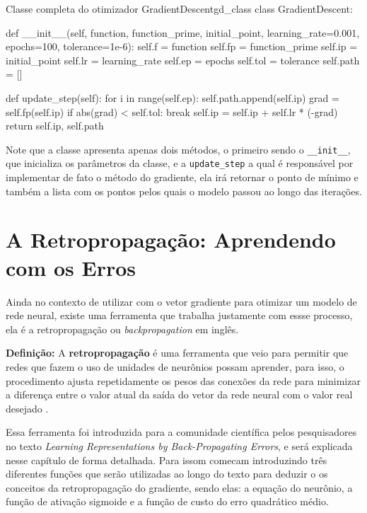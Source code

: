 \begin{codelisting}{Classe completa do otimizador GradientDescent}{gd_class}
class GradientDescent:

    def __init__(self, function, function_prime, initial_point, learning_rate=0.001, epochs=100, tolerance=1e-6):
        self.f = function
        self.fp = function_prime
        self.ip = initial_point
        self.lr = learning_rate
        self.ep = epochs
        self.tol = tolerance
        self.path = []

    def update_step(self):
        for i in range(self.ep):
            self.path.append(self.ip)
            grad = self.fp(self.ip)
            if abs(grad) < self.tol: break
            self.ip = self.ip + self.lr * (-grad)
        return self.ip, self.path
\end{codelisting}

Note que a classe apresenta apenas dois métodos, o primeiro sendo o \texttt{\_\_init\_\_}, que inicializa os parâmetros da classe, e a \texttt{update\_step} a qual é responsável por implementar de fato o método do gradiente, ela irá retornar o ponto de mínimo e também a lista com os pontos pelos quais o modelo passou ao longo das iterações.


\section{A Retropropagação: Aprendendo com os Erros}

Ainda no contexto de utilizar com o vetor gradiente para otimizar um modelo de rede neural, existe uma ferramenta que trabalha justamente com essse processo, ela é a retropropagação ou \textit{backpropagation} em inglês.

\begin{definicaomoderna}{\textbf{Definição:}}
A \textbf{retropropagação} é uma ferramenta que veio para permitir que redes que fazem o uso de unidades de neurônios possam aprender, para isso, o procedimento ajusta repetidamente os pesos das conexões da rede para minimizar a diferença entre o valor atual da saída do vetor da rede neural com o valor real desejado \parencite{BackpropagationArticle}.
\end{definicaomoderna}

Essa ferramenta foi introduzida para a comunidade científica pelos pesquisadores \textcite{BackpropagationArticle} no texto \textit{Learning Representations by Back-Propagating Errors}, e será explicada nesse capítulo de forma detalhada. Para issom \textcite{BackpropagationArticle} comecam introduzindo três diferentes funções que serão utilizadas ao longo do texto para deduzir o os conceitos da retropropagação do gradiente, sendo elas: a equação do neurônio, a função de ativação sigmoide e a função de custo do erro quadrático médio.


